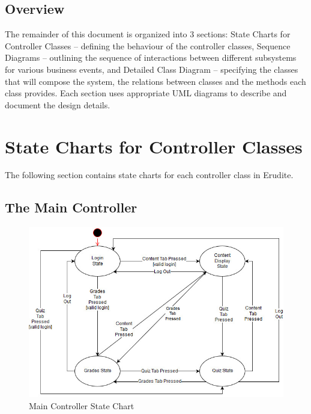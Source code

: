 \documentclass[]{article}
\begin{document}
\subsection{Overview}
\label{sub:overview}
The remainder of this document is organized into 3 sections: State Charts for
Controller Classes -- defining the behaviour of the controller classes,
Sequence Diagrams -- outlining the sequence of interactions between different
subsystems for various business events, and Detailed Class Diagram --
specifying the classes that will compose the system, the relations between
classes and the methods each class provides. Each section uses appropriate UML
diagrams to describe and document the design details.


\newpage
\section{State Charts for Controller Classes}
\label{sec:state_charts_for_controller_classes}
The following section contains state charts for each controller class in Erudite.

\subsection{The Main Controller}
{
\begin{figure}[H]
  \centering
  \includegraphics[scale=0.5]{A3_Assets/MainController.jpg}
  \caption{Main Controller State Chart}
\end{figure}
}
\end{document}
